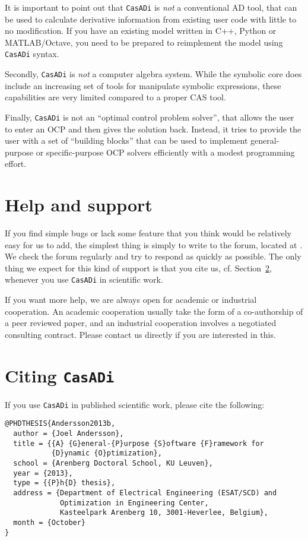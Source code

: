 \documentclass[a4paper,12pt]{book}
\newcommand{\CasADi}{\texttt{CasADi}\xspace}
\begin{document}
It is important to point out that \CasADi is \emph{not} a conventional AD tool, that can be used to calculate derivative information from existing user code with little to no modification. If you have an existing model written in C++, Python or MATLAB/Octave, you need to be prepared to reimplement the model using \CasADi syntax.

Secondly, \CasADi is \emph{not} a computer algebra system. While the symbolic core does include an increasing set of tools for manipulate symbolic expressions, these capabilities are very limited compared to a proper CAS tool.

Finally, \CasADi is not an ``optimal control problem solver'', that allows the user to enter an OCP and then gives the solution back. Instead, it tries to provide the user with a set of ``building blocks'' that can be used to implement general-purpose or specific-purpose OCP solvers efficiently with a modest programming effort.

\section{Help and support} \label{sec:support}
If you find simple bugs or lack some feature that you think would be relatively easy for us to add, the simplest thing is simply to write to the forum, located at . We check the forum regularly and try to respond as quickly as possible. The only thing we expect for this kind of support is that you cite us, cf. Section~\ref{sec:citing}, whenever you use \CasADi in scientific work.

If you want more help, we are always open for academic or industrial cooperation. An academic cooperation usually take the form of a co-authorship of a peer reviewed paper, and an industrial cooperation involves a negotiated consulting contract. Please contact us directly if you are interested in this.

\section{Citing \CasADi} \label{sec:citing}
If you use \CasADi in published scientific work, please cite the following:
\begin{verbatim}
@PHDTHESIS{Andersson2013b,
  author = {Joel Andersson},
  title = {{A} {G}eneral-{P}urpose {S}oftware {F}ramework for
           {D}ynamic {O}ptimization},
  school = {Arenberg Doctoral School, KU Leuven},
  year = {2013},
  type = {{P}h{D} thesis},
  address = {Department of Electrical Engineering (ESAT/SCD) and
             Optimization in Engineering Center,
             Kasteelpark Arenberg 10, 3001-Heverlee, Belgium},
  month = {October}
}
\end{verbatim}
\end{document}
